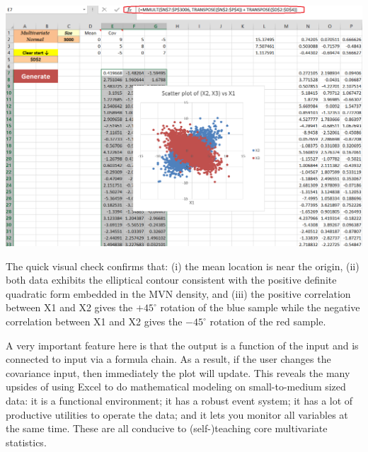 \documentclass[article]{jss}
\begin{document}
        \begin{center}
        \includegraphics[width=\linewidth, keepaspectratio=true]{RandSheetOutput_png}
        \end{center}
        The quick visual check confirms that: (i) the mean location is near the origin, (ii) both data exhibits the elliptical contour consistent with the positive definite quadratic form embedded in the MVN density, and (iii) the positive correlation between X1 and X2 gives the $+45^\circ$ rotation of the blue sample while the negative correlation between X1 and X2 gives the $-45^\circ$ rotation of the red sample.
        
        A very important feature here is that the output is a function of the input and is connected to input via a formula chain. As a result, if the user changes the covariance input, then immediately the plot will update. This reveals the many upsides of using Excel to do mathematical modeling on small-to-medium sized data: it is a functional environment; it has a robust event system; it has a lot of productive utilities to operate the data; and it lets you monitor all variables at the same time. These are all conducive to (self-)teaching core multivariate statistics.
        
\end{document}

